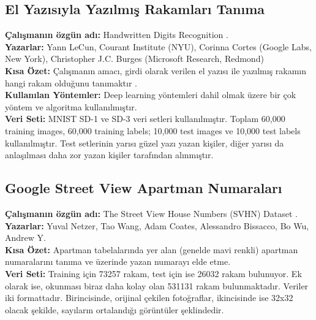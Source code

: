 \documentclass[12pt,a4paper]{article}
\begin{document}
    \subsection{El Yazısıyla Yazılmış Rakamları Tanıma}
    \textbf{Çalışmanın özgün adı:} Handwritten Digits Recognition \cite{minst}. \\
    \textbf{Yazarlar:} 
	Yann LeCun, Courant Institute (NYU), Corinna Cortes (Google Labs, New York), Christopher J.C. Burges (Microsoft Research, Redmond) \\
    \textbf{Kısa Özet:} Çalışmanın amacı, girdi olarak verilen el yazısı ile yazılmış rakamın hangi
rakam olduğunu tanımaktır \cite{minst}. \\
    \textbf{Kullanılan Yöntemler:} Deep learning yöntemleri dahil olmak üzere bir çok yöntem ve
algoritma kullanılmıştır. \\
	\textbf{Veri Seti:} MNIST SD-1 ve SD-3 veri setleri kullanılmıştır. Toplam 60,000 training
images, 60,000 training labels; 10,000 test images ve 10,000 test labels kullanılmıştır. Test
setlerinin yarısı güzel yazı yazan kişiler, diğer yarısı da anlaşılması daha zor yazan kişiler
tarafından alınmıştır.\\

    \subsection{Google Street View Apartman Numaraları}
    \textbf{Çalışmanın özgün adı:} The Street View House Numbers (SVHN) Dataset \cite{svhn}. \\
    \textbf{Yazarlar:} 
	Yuval Netzer, Tao Wang, Adam Coates, Alessandro Bissacco, Bo Wu,
Andrew Y. \\
    \textbf{Kısa Özet:} Apartman tabelalarında yer alan (genelde mavi renkli) apartman numaralarını tanıma ve üzerinde yazan numarayı elde etme. \\
	\textbf{Veri Seti:} Training için 73257 rakam, test için ise 26032 rakam bulunuyor. Ek olarak
ise, okunması biraz daha kolay olan 531131 rakam bulunmaktadır.
Veriler iki formattadır. Birincisinde, orijinal çekilen fotoğraflar, ikincisinde ise 32x32 olacak
şekilde, sayıların ortalandığı görüntüler şeklindedir. \\
\end{document}

